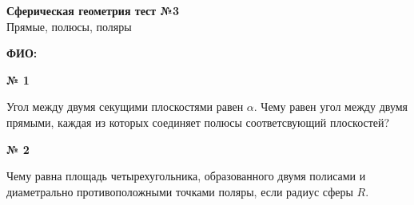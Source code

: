 


    \begin{center}
        \textbf{Сферическая геометрия тест №3}\\
        Прямые, полюсы, поляры
    \end{center}

    \textbf{ФИО:}

    \begin{center}
        \textbf{№ 1}
    \end{center}

    Угол между двумя секущими плоскостями равен $\alpha$.
    Чему равен угол между двумя прямыми,
    каждая из которых соединяет полюсы соответсвующий плоскостей?

    \begin{center}
        \textbf{№ 2}
    \end{center}

    Чему равна площадь четырехугольника, образованного двумя полисами и диаметрально противоположными точками поляры,
    если радиус сферы $R$.



